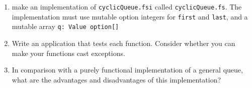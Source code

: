 \begin{enumerate}
\item make an implementation of \lstinline[language=console]{cyclicQueue.fsi} called \lstinline[language=console]{cyclicQueue.fs}. The implementation must use mutable option integers for \lstinline{first} and \lstinline{last}, and a mutable array \lstinline{q: Value option[]}
\item Write an application that tests each function. Consider whether you can make your functions cast exceptions.
\item In comparison with a purely functional implementation of a general queue, what are the advantages and disadvantages of this implementation?
\end{enumerate}
